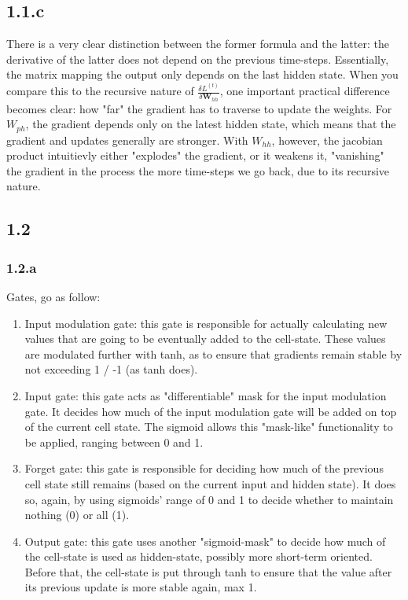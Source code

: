 \subsection*{1.1.c}
There is a very clear distinction between the former formula and the latter: the derivative of the latter
does not depend on the previous time-steps. Essentially, the matrix mapping the output only depends on the last
hidden state. When you compare this to the recursive nature of $\frac{\delta L^{(t)}}{\delta \textbf{W}_{hh}}$, 
one important practical difference becomes clear: how "far" the gradient has to traverse to update the weights. For
$W_{ph}$, the gradient depends only on the latest hidden state, which means that the gradient and updates
generally are stronger. With $W_{hh}$, however, the jacobian product intuitievly either "explodes" the
gradient, or it weakens it, "vanishing" the gradient in the process the more time-steps we go back, due to 
its recursive nature.

\subsection*{1.2}
\subsubsection*{1.2.a}
Gates, go as follow:

\begin{enumerate}
    \item Input modulation gate: this gate is responsible for actually calculating new values that 
    are going to be eventually added to the cell-state. These values are modulated further with tanh,
    as to ensure that gradients remain stable by not exceeding 1 / -1 (as tanh does).
    \item Input gate: this gate acts as "differentiable" mask for the input modulation gate.
    It decides how much of the input modulation gate will be added on top of the current cell state.
    The sigmoid allows this "mask-like" functionality to be applied, ranging between 0 and 1.
    \item Forget gate: this gate is responsible for deciding how much of the previous cell state
    still remains (based on the current input and hidden state). It does so, again, by using
    sigmoids' range of 0 and 1 to decide whether to maintain nothing (0) or all (1).
    \item Output gate: this gate uses another "sigmoid-mask" to decide how much of the cell-state
    is used as hidden-state, possibly more short-term oriented. Before that, the cell-state
    is put through tanh to ensure that the value after its previous update is more stable again, max 1.
\end{enumerate}

